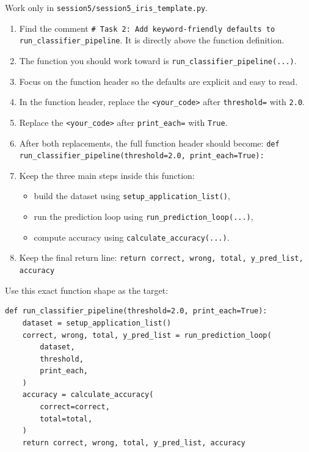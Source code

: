 \begin{tcolorbox}[title=Task 2: Add keyword-friendly defaults to \texttt{run\_classifier\_pipeline}]
Work only in \texttt{session5/session5\_iris\_template.py}.

\begin{enumerate}
    \item Find the comment \texttt{\# Task 2: Add keyword-friendly defaults to \texttt{run\_classifier\_pipeline}}. It is directly above the function definition.
    \item The function you should work toward is \texttt{run\_classifier\_pipeline(...)}.
    \item Focus on the function header so the defaults are explicit and easy to read.
    \item In the function header, replace the \texttt{<your\_code>} after \texttt{threshold=} with \texttt{2.0}.
    \item Replace the \texttt{<your\_code>} after \texttt{print\_each=} with \texttt{True}.
    \item After both replacements, the full function header should become:
    \texttt{def run\_classifier\_pipeline(threshold=2.0, print\_each=True):}
    \item Keep the three main steps inside this function:
    \begin{itemize}
        \item build the dataset using \texttt{setup\_application\_list()},
        \item run the prediction loop using \texttt{run\_prediction\_loop(...)},
        \item compute accuracy using \texttt{calculate\_accuracy(...)}.
    \end{itemize}
    \item Keep the final return line:
    \texttt{return correct, wrong, total, y\_pred\_list, accuracy}
\end{enumerate}
\end{tcolorbox}

Use this exact function shape as the target:

\begin{verbatim}
def run_classifier_pipeline(threshold=2.0, print_each=True):
    dataset = setup_application_list()
    correct, wrong, total, y_pred_list = run_prediction_loop(
        dataset,
        threshold,
        print_each,
    )
    accuracy = calculate_accuracy(
        correct=correct,
        total=total,
    )
    return correct, wrong, total, y_pred_list, accuracy
\end{verbatim}

